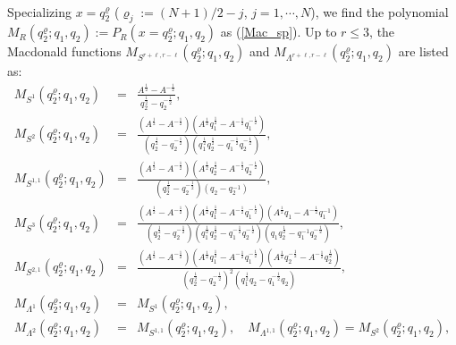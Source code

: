 \documentclass[hyper,letterpaper]{JHEP3}
\begin{document}
\\
Specializing $x=q_2^{\varrho}$ ($\varrho_j:=(N+1)/2-j$, $j=1,\cdots
,N$), we find the polynomial
$M_R(q_2^{\varrho};q_1,q_2):=P_R(x=q_2^{\varrho};q_1,q_2)$ as (\ref{Mac_sp}).
Up to $r\le 3$, the Macdonald functions
$M_{S^{r+\ell,r-\ell}}(q_2^{\varrho};q_1,q_2)$ and
$M_{\Lambda^{r+\ell,r-\ell}}(q_2^{\varrho};q_1,q_2)$ are listed as:
\begin{eqnarray}
M_{S^1}(q_2^{\varrho};q_1,q_2)&=&\frac{A^{\frac{1}{2}}-A^{-\frac{1}{2}}}{q_2^{\frac{1}{2}}-q_2^{-\frac{1}{2}}},
\nonumber \\
M_{S^2}(q_2^{\varrho};q_1,q_2)&=&\frac{\left(A^{\frac{1}{2}}-A^{-\frac{1}{2}}\right)\left(
A^{\frac{1}{2}}q_1^{\frac{1}{2}}-A^{-\frac{1}{2}}q_1^{-\frac{1}{2}}\right)}
{\left(q_2^{\frac{1}{2}}-q_2^{-\frac{1}{2}}\right)\left(q_1^{\frac{1}{2}}q_2^{\frac{1}{2}}-q_1^{-\frac{1}{2}}q_2^{-\frac{1}{2}}\right)},
\nonumber \\
M_{S^{1,1}}(q_2^{\varrho};q_1,q_2)&=&\frac{\left(A^{\frac{1}{2}}-A^{-\frac{1}{2}}\right)\left(
A^{\frac{1}{2}}q_2^{\frac{1}{2}}-A^{-\frac{1}{2}}q_2^{-\frac{1}{2}}\right)}
{\left(q_2^{\frac{1}{2}}-q_2^{-\frac{1}{2}}\right)\left(q_2-q_2^{-1}\right)},
\nonumber \\
M_{S^3}(q_2^{\varrho};q_1,q_2)&=&\frac{\left(A^{\frac{1}{2}}-A^{-\frac{1}{2}}\right)\left(
A^{\frac{1}{2}}q_1^{\frac{1}{2}}-A^{-\frac{1}{2}}q_1^{-\frac{1}{2}}\right)
\left(
A^{\frac{1}{2}}q_1-A^{-\frac{1}{2}}q_1^{-1}\right)}
{\left(q_2^{\frac{1}{2}}-q_2^{-\frac{1}{2}}\right)\left(q_1^{\frac{1}{2}}q_2^{\frac{1}{2}}-q_1^{-\frac{1}{2}}q_2^{-\frac{1}{2}}\right)\left(q_1q_2^{\frac{1}{2}}-q_1^{-1}q_2^{-\frac{1}{2}}\right)},
\nonumber \\
M_{S^{2,1}}(q_2^{\varrho};q_1,q_2)&=&\frac{\left(A^{\frac{1}{2}}-A^{-\frac{1}{2}}\right)\left(A^{\frac{1}{2}}q_1^{\frac{1}{2}}-A^{-\frac{1}{2}}q_1^{-\frac{1}{2}}\right)\left(A^{\frac{1}{2}}q_2^{-\frac{1}{2}}-A^{-\frac{1}{2}}q_2^{\frac{1}{2}}\right)}{\left(q_2^{\frac{1}{2}}-q_2^{-\frac{1}{2}}\right)^2\left(q_1^{\frac{1}{2}}q_2-q_1^{-\frac{1}{2}}q_2\right)},
\nonumber \\
M_{\Lambda^1}(q_2^{\varrho};q_1,q_2)&=&M_{S^1}(q_2^{\varrho};q_1,q_2),
\nonumber \\
M_{\Lambda^2}(q_2^{\varrho};q_1,q_2)&=&M_{S^{1,1}}(q_2^{\varrho};q_1,q_2),
\quad M_{\Lambda^{1,1}}(q_2^{\varrho};q_1,q_2)=M_{S^{2}}(q_2^{\varrho};q_1,q_2),
\nonumber \\

\end{eqnarray}
\end{document}
